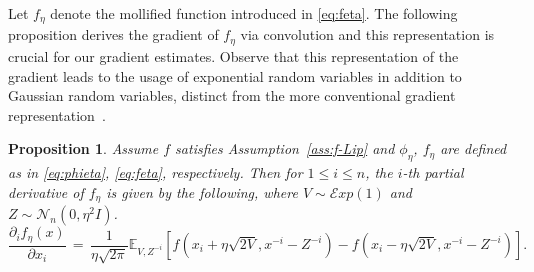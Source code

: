 \documentclass[11pt,reqno]{amsart}
\newcommand{\1}{{\bf 1}}
\newcommand{\2}{{\bf 2}}
\newcommand{\mr}[1]{{\color{blue}#1}}
\newcommand{\pc}[1]{{\color{cyan}#1}}
\numberwithin{equation}{section}
\newtheorem{proposition}{Proposition}[section]
\theoremstyle{remark}
\begin{document}
		\medskip 
		Let  $f_\eta$ denote the mollified function introduced in \eqref{eq:feta}. 
		The following proposition derives the gradient of $f_{\eta}$ via convolution and this  
		representation is crucial for our gradient estimates. Observe that this representation of the gradient leads to the usage of exponential random variables in addition to Gaussian random variables, distinct from the more conventional gradient representation~\cite{nesterov2017random}.
		\begin{proposition}\label{prop:gradfeta}
			Assume $f$ satisfies Assumption~\ref{ass:f-Lip} and $\phi_{\eta}$, $f_{\eta}$ are defined as in \eqref{eq:phieta}, \eqref{eq:feta}, respectively.  %
			Then for $1 \leq i \leq n$, the $i$-th partial derivative of $f_\eta$ is given by the following,  
			where $V \sim \mathcal{E}xp(1)$ and $Z \sim \mathcal{N}_n(0, \eta^2 I)$.
			\begin{equation}\label{eq:GradientfetaD}
				\frac{\partial_i f_{\eta}(x)}{\partial x_i} \,  = \, \frac{1}{\eta \sqrt{2\pi}}\mathbb{E}_{V,Z^{-i}}\left[f\left(x_i+\eta\sqrt{2V},x^{-i}-Z^{-i}\right)-f\left(x_i-\eta\sqrt{2V},x^{-i}-Z^{-i}\right)\right].
			\end{equation}
		\end{proposition}
\end{document}
